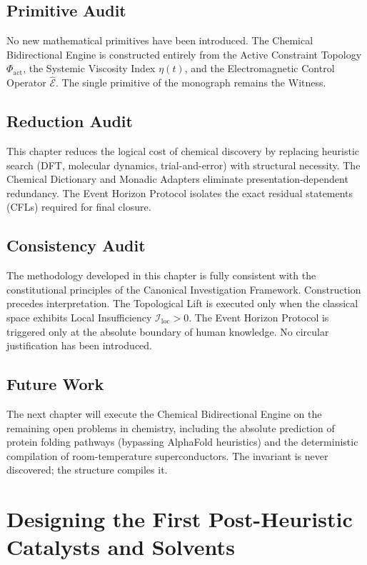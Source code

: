 \documentclass[11pt,openany]{extbook}
\newenvironment{primitiveaudit}{\section*{Primitive Audit}}{}
\newenvironment{reductionaudit}{\section*{Reduction Audit}}{}
\newenvironment{consistencyaudit}{\section*{Consistency Audit}}{}
\newenvironment{futurework}{\section*{Future Work}}{}
\theoremstyle{plain}
\theoremstyle{definition}
\begin{document}
\begin{primitiveaudit}
\noindent No new mathematical primitives have been introduced. The Chemical Bidirectional Engine is constructed entirely from the Active Constraint Topology $\Phi_{\text{act}}$, the Systemic Viscosity Index $\eta(t)$, and the Electromagnetic Control Operator $\hat{\mathcal{E}}$. The single primitive of the monograph remains the Witness.
\end{primitiveaudit}

\begin{reductionaudit}
\noindent This chapter reduces the logical cost of chemical discovery by replacing heuristic search (DFT, molecular dynamics, trial-and-error) with structural necessity. The Chemical Dictionary and Monadic Adapters eliminate presentation-dependent redundancy. The Event Horizon Protocol isolates the exact residual statements (CFLs) required for final closure.
\end{reductionaudit}

\begin{consistencyaudit}
\noindent The methodology developed in this chapter is fully consistent with the constitutional principles of the Canonical Investigation Framework. Construction precedes interpretation. The Topological Lift is executed only when the classical space exhibits Local Insufficiency $\mathcal{I}_{\text{loc}} > 0$. The Event Horizon Protocol is triggered only at the absolute boundary of human knowledge. No circular justification has been introduced.
\end{consistencyaudit}

\begin{futurework}
\noindent The next chapter will execute the Chemical Bidirectional Engine on the remaining open problems in chemistry, including the absolute prediction of protein folding pathways (bypassing AlphaFold heuristics) and the deterministic compilation of room-temperature superconductors. The invariant is never discovered; the structure compiles it.
\end{futurework}

\chapter{Designing the First Post-Heuristic Catalysts and Solvents}

\end{document}
